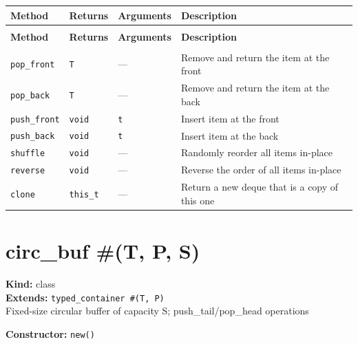 \documentclass[11pt,letterpaper]{report}
\begin{document}
\begin{xltabular}{\linewidth}{>{\small}p{1.35in} >{\small}p{1.25in} >{\small}p{0.95in} >{\small}X}
\toprule
\textbf{Method} & \textbf{Returns} & \textbf{Arguments} & \textbf{Description} \\
\midrule
\endfirsthead
{} \\
\midrule
\textbf{Method} & \textbf{Returns} & \textbf{Arguments} & \textbf{Description} \\
\midrule
\endhead
\midrule
{} \\
\endfoot
\bottomrule
\endlastfoot
\texttt{pop\_front} & \texttt{T} & --- & Remove and return the item at the front \\
\texttt{pop\_back} & \texttt{T} & --- & Remove and return the item at the back \\
\texttt{push\_front} & \texttt{void} & \texttt{t} & Insert item at the front \\
\texttt{push\_back} & \texttt{void} & \texttt{t} & Insert item at the back \\
\texttt{shuffle} & \texttt{void} & --- & Randomly reorder all items in-place \\
\texttt{reverse} & \texttt{void} & --- & Reverse the order of all items in-place \\
\texttt{clone} & \texttt{this\_t} & --- & Return a new deque that is a copy of this one \\
\end{xltabular}

\section{circ\_buf \#(T, P, S)}
\label{cls:circbufTPS}

\noindent\textbf{Kind:} class\\
\noindent\textbf{Extends:} \texttt{typed\_container \#(T, P)}\\
\noindent Fixed-size circular buffer of capacity S; push\_tail/pop\_head operations

\noindent\textbf{Constructor:} \texttt{new()}
\end{document}
